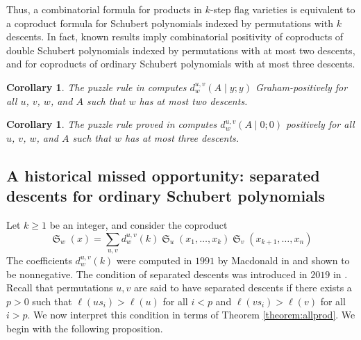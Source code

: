 \documentclass{amsart}
\newtheorem{corollary}[lemma]{Corollary}
\theoremstyle{definition}
\theoremstyle{remark}
\numberwithin{equation}{subsection}
\DeclareMathOperator{\sch}{\mathfrak{S}}
\newcommand{\cpcf}[5]{d^{#1,#2}_{#3}\left(#4\mid #5\right)}
\begin{document}
Thus, a combinatorial formula for products in $k$-step flag varieties is equivalent to a coproduct formula for Schubert polynomials indexed by permutations with $k$ descents. In fact, known results imply combinatorial positivity of coproducts of double Schubert polynomials indexed by permutations with at most two descents, and for coproducts of ordinary Schubert polynomials with at most three descents.

\begin{corollary}
The puzzle rule in \cite{buch2015mutations} computes $\cpcf{u}{v}{w}{A}{y;y}$ Graham-positively for all $u$, $v$, $w$, and $A$ such that $w$ has at most two descents.
\end{corollary}

\begin{corollary}
The puzzle rule proved in \cite{threestep} computes $\cpcf{u}{v}{w}{A}{0;0}$ positively for all $u$, $v$, $w$, and $A$ such that $w$ has at most three descents.
\end{corollary}

\subsection{A historical missed opportunity: separated descents for ordinary Schubert polynomials}

Let $k\geq 1$ be an integer, and consider the coproduct
$$\sch_w(x)=\sum_{u,v}d_w^{u,v}(k)\sch_u(x_1,\ldots,x_k)\sch_v(x_{k+1},\ldots,x_n)$$
The coefficients $d_w^{u,v}(k)$ were computed in $1991$ by Macdonald in \cite[(4.19)]{notes} and shown to be nonnegative. The condition of separated descents was introduced in $2019$ in \cite{kzj}. Recall that permutations $u,v$ are said to have separated descents if there exists a $p>0$ such that $\ell(us_i)>\ell(u)$ for all $i<p$ and $\ell(vs_i)>\ell(v)$ for all $i>p$. We now interpret this condition in terms of Theorem \ref{theorem:allprod}. We begin with the following proposition.
\end{document}
